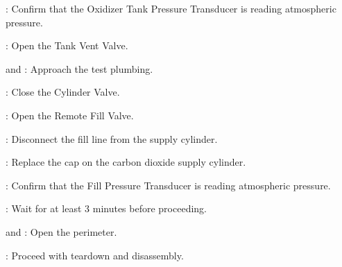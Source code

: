 \begin{checklist}
    \item \daq{}: Confirm that the Oxidizer Tank Pressure Transducer is reading atmospheric pressure.
    \item \primary{}: Open the Tank Vent Valve.
    \item \primary{} and \secondary: Approach the test plumbing.
    \item \primary{}: Close the Cylinder Valve.
    \item \primary{}: Open the Remote Fill Valve.
    \item \primary{}: Disconnect the fill line from the supply cylinder.
    \item \primary{}: Replace the cap on the carbon dioxide supply cylinder.
    \item \daq{}: Confirm that the Fill Pressure Transducer is reading atmospheric pressure.
    \item \ops{}: Wait for at least 3 minutes before proceeding.
    \item \peri{} and \perii{}: Open the perimeter.
    \item \ops{}: Proceed with teardown and disassembly.

\end{checklist}
\setcounter{checklistnum}{0}

\newpage
    
